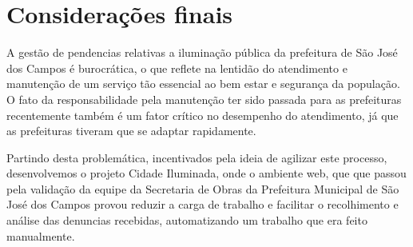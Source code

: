 \documentclass[
	article,			%
	11pt,				%
	oneside,			%
	a4paper,			%
	english,			%
	brazil,				%
	sumario=tradicional
	]{abntex2}
\begin{document}






%

\section*{Considerações finais}

A gestão de pendencias relativas a iluminação pública da prefeitura de São José
dos Campos é burocrática, o que reflete na lentidão do atendimento e manutenção
de um serviço tão essencial ao bem estar e segurança da população. O fato da
responsabilidade pela manutenção ter sido passada para as prefeituras recentemente
também é um fator crítico no desempenho do atendimento, já que as prefeituras
tiveram que se adaptar rapidamente.

Partindo desta problemática, incentivados pela ideia de agilizar este processo,
desenvolvemos o projeto Cidade Iluminada, onde o ambiente web, que que passou
pela validação da equipe da Secretaria de Obras da Prefeitura Municipal de São
José dos Campos provou reduzir a carga de trabalho e facilitar o recolhimento e
análise das denuncias recebidas, automatizando um trabalho que era feito manualmente.
\end{document}
